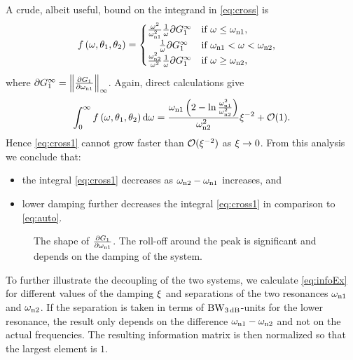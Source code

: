 A crude, albeit useful, bound on the integrand in \eqref{eq:cross} is
\begin{align}
&f\left(\omega,\theta_1,\theta_2\right)=
  \begin{cases}
   \frac{\omega^2}{\wn[1]^2}
   \frac{1}{\omega}
   \partial G_1^\infty
                                       & \text{if $\omega \leq \wn[1]$,}\\
   \phantom{\frac{\omega^2}{\omega^2}}
   \frac{1}{\omega}
   \partial G_1^\infty
                                       & \text{if $\wn[1] < \omega < \wn[2]$,}\\
   \frac{\wn[2]^2}{\omega^2}
   \frac{1}{\omega}
   \partial G_1^\infty
                                       & \text{if $\omega \geq \wn[2]$,}
  \end{cases}
\end{align}
where $\partial G_1^\infty = \left\|\frac{\partial G_1}{\partial \wn[1]}\right\|_\infty$. 
Again, direct calculations give
\begin{align}
\int_0^\infty f\left(\omega,\theta_1,\theta_2\right)\dd\omega = \frac{\wn[1]\left(2-\ln{\frac{\wn[1]^2}{\wn[2]^2}}\right)}{\wn[2]^2}\damping^{-2} + \mathcal{O}(1).
\end{align}
Hence \eqref{eq:cross1} cannot grow faster than $\mathcal{O}(\damping^{-2})$ as $\damping\rightarrow0$. From this analysis we conclude that:
\begin{itemize}
\item the integral \eqref{eq:cross1} decreases as $\wn[2]-\wn[1]$ increases, and
\item lower damping further decreases the integral \eqref{eq:cross1} in comparison to \eqref{eq:auto}.
\end{itemize}

\begin{figure}
\centering

\caption{The shape of $\frac{\partial G_1}{\partial \wn[1]}$. The roll-off around the peak is significant and depends on the damping of the system.}
\label{fig:dG}
\end{figure}

To further illustrate the decoupling of the two systems, we calculate \eqref{eq:infoEx} for different values of the damping $\damping$ and separations of the two resonances $\wn[1]$ and $\wn[2]$. If the separation is taken in terms of $\wdB$-units for the lower resonance, the result only depends on the difference $\wn[1]-\wn[2]$ and not on the actual frequencies. The resulting information matrix is then normalized so that the largest element is $1$.

